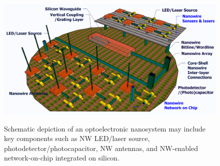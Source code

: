 \begin{figure}
  \caption{Schematic depiction of an optoelectronic nanosystem may include key components such as NW LED/laser source, photodetector/photocapacitor, NW antennas, and NW-enabled network-on-chip integrated on silicon.}
  \centering
  \includegraphics[width=\textwidth]{pictures/Conclusion/NWPIC_NB}
  \label{NWPIC_NB}
\end{figure}

